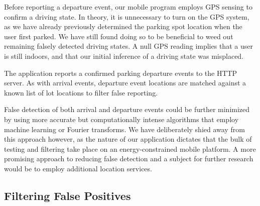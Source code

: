 Before reporting a departure event, our mobile program employs GPS sensing
to confirm a driving state.  In theory, it is unnecessary to turn on the
GPS system, as we have already previously determined the parking spot
location when the user first parked.  We have still found doing so to
be beneficial to weed out remaining falsely detected driving states.  A null
GPS reading implies that a user is still indoors, and that our initial
inference of a driving state was misplaced.

The application reports a confirmed parking departure events to the
HTTP server.  As with arrival events, departure event locations are matched
against a known list of lot locations to filter false reporting.

False detection of both arrival and departure events could be further
minimized by using more accurate but computationally intense algorithms that
employ machine learning or Fourier transforms. We have deliberately shied
away from this approach however, as the nature of our application dictates
that the bulk of testing and filtering take place on an energy-constrained
mobile platform. A more promising approach to reducing false detection and a
subject for further research would be to employ additional location services.

\subsection{Filtering False Positives}

